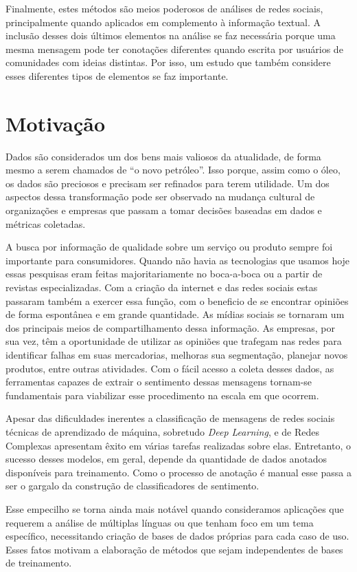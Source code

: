 Finalmente, estes métodos são meios poderosos de análises de redes sociais,
principalmente quando aplicados em complemento à informação textual.
A inclusão desses dois últimos elementos na análise se faz necessária porque uma
mesma mensagem pode ter conotações diferentes quando escrita por usuários de
comunidades com ideias distintas.
Por isso, um estudo que também considere esses diferentes tipos de elementos se
faz importante.

\section{Motivação}

Dados são considerados um dos bens mais valiosos da atualidade, de forma mesmo a
serem chamados de ``o novo petróleo''.
Isso porque, assim como o óleo, os dados são preciosos e precisam ser refinados
para terem utilidade.
Um dos aspectos dessa transformação pode ser observado na mudança cultural de
organizações e empresas que passam a tomar decisões baseadas em dados e métricas
coletadas.

A busca por informação de qualidade sobre um serviço ou produto sempre foi
importante para consumidores.
Quando não havia as tecnologias que usamos hoje essas pesquisas eram feitas
majoritariamente no boca-a-boca ou a partir de revistas especializadas.
Com a criação da internet e das redes sociais estas passaram também a exercer
essa função, com o beneficio de se encontrar opiniões de forma espontânea e em
grande quantidade.
As mídias sociais se tornaram um dos principais meios de compartilhamento dessa
informação.
As empresas, por sua vez, têm a oportunidade de utilizar as opiniões que
trafegam nas redes para identificar falhas em suas mercadorias, melhoras sua
segmentação, planejar novos produtos, entre outras atividades.
Com o fácil acesso a coleta desses dados, as ferramentas capazes de extrair o
sentimento dessas mensagens tornam-se fundamentais para viabilizar esse
procedimento na escala em que ocorrem.

Apesar das dificuldades inerentes a classificação de mensagens de redes sociais
técnicas de aprendizado de máquina, sobretudo \textit{Deep Learning}, e de Redes
Complexas apresentam êxito em várias tarefas realizadas sobre elas.
Entretanto, o sucesso desses modelos, em geral, depende da quantidade de dados
anotados disponíveis para treinamento.
Como o processo de anotação é manual esse passa a ser o gargalo da construção de
classificadores de sentimento.

Esse empecilho se torna ainda mais notável quando consideramos aplicações que
requerem a análise de múltiplas línguas ou que tenham foco em um tema
específico, necessitando criação de bases de dados próprias para cada caso de
uso.
Esses fatos motivam a elaboração de métodos que sejam independentes de bases de
treinamento.

